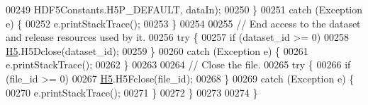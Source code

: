 \begin{DoxyCode}
00249                         HDF5Constants.H5P\_DEFAULT, dataIn);
00250         \}
00251         \textcolor{keywordflow}{catch} (Exception e) \{
00252             e.printStackTrace();
00253         \}
00254 
00255         \textcolor{comment}{// End access to the dataset and release resources used by it.}
00256         \textcolor{keywordflow}{try} \{
00257             \textcolor{keywordflow}{if} (dataset\_id >= 0)
00258                 \hyperlink{namespace_h5}{H5}.H5Dclose(dataset\_id);
00259         \}
00260         \textcolor{keywordflow}{catch} (Exception e) \{
00261             e.printStackTrace();
00262         \}
00263 
00264         \textcolor{comment}{// Close the file.}
00265         \textcolor{keywordflow}{try} \{
00266             \textcolor{keywordflow}{if} (file\_id >= 0)
00267                 \hyperlink{namespace_h5}{H5}.H5Fclose(file\_id);
00268         \}
00269         \textcolor{keywordflow}{catch} (Exception e) \{
00270             e.printStackTrace();
00271         \}
00272     \}
00273 
00274 \}
\end{DoxyCode}
